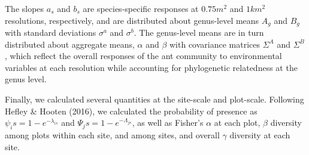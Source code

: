 \documentclass[10pt,a4paper,draft]{article}
\begin{document}
The slopes $a_s$ and $b_s$ are species-specific responses at $0.75 m^2$ and $1 km^2$ resolutions, respectively, and are distributed about genus-level means $A_g$ and $B_g$ with standard deviations $\sigma^a$ and $\sigma^b$. The genus-level means are in turn distributed about aggregate means, $\alpha$ and $\beta$ with covariance matrices $\Sigma^A$ and $\Sigma^B$, which reflect the overall responses of the ant community to environmental variables at each resolution while accounting for phylogenetic relatedness at the genus level.

Finally, we calculated several quantities at the site-scale and plot-scale. Following Hefley \& Hooten (2016), we calculated the probability of presence as $\psi_is = 1 - e^{-\lambda_{is}}$ and $\Psi_js = 1 - e^{-\Lambda_{js}}$, as well as Fisher's $\alpha$ at each plot, $\beta$ diversity among plots within each site, and among sites, and overall $\gamma$ diversity at each site. 
\end{document}

